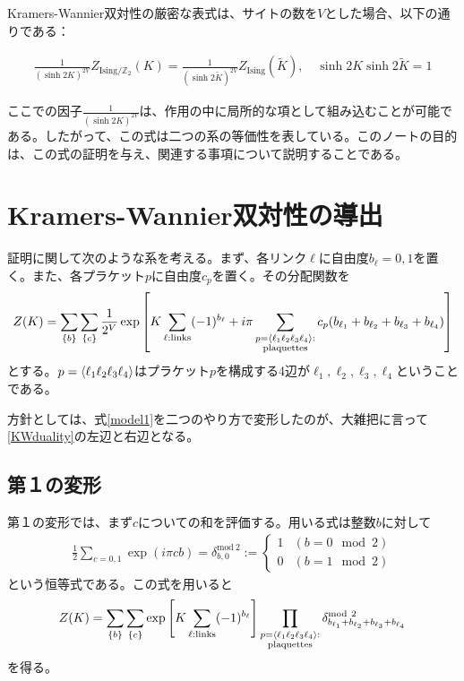 \documentclass[a4paper,12pt,dvipdfmx]{jlreq}
\newenvironment{important}{\begin{tcolorbox}[
  colback = white,
  colframe = red!35,
  boxrule = 2mm,
  fonttitle = \bfseries,
  after = \noindent] }{\end{tcolorbox}}
\newcommand{\Kt}{\widetilde{K}}
\newcommand{\ZIs}{Z_{\mathrm{Ising}}}
\newcommand{\ZGIs}{Z_{\mathrm{Ising}/\mathbb{Z}_2}}
\newcommand{\deltamod}{\delta^{\mathrm{mod}\ 2}}
\begin{document}
Kramers-Wannier双対性の厳密な表式は、サイトの数を$V$とした場合、以下の通りである：
\begin{important}
\begin{align}
\frac{1}{(\sinh 2K)^{2V}}\ZGIs(K)=
\frac{1}{(\sinh 2\Kt)^{2V}}\ZIs(\Kt),\quad \sinh 2K \sinh 2\Kt=1
\label{KWduality}
\end{align}
\end{important}
ここでの因子$\frac{1}{(\sinh 2K)^{2V}}$は、作用の中に局所的な項として組み込むことが可能である。したがって、この式は二つの系の等価性を表している。このノートの目的は、この式の証明を与え、関連する事項について説明することである。

\section{Kramers-Wannier双対性の導出}
証明に関して次のような系を考える。まず、各リンク$\ell$に自由度$b_{\ell}=0,1$を置く。また、各プラケット$p$に自由度$c_{p}$を置く。その分配関数を
\begin{align}
  Z(K)=\sum_{\{b\}}\sum_{\{c\}}\frac{1}{2^{V}} \exp\left[
    K\sum_{\ell:\text{links}}(-1)^{b_{\ell}}+i\pi\sum_{\substack{p=\expval{\ell_1 \ell_2 \ell_3 \ell_4}:\\ \text{plaquettes}}} c_{p}(b_{\ell_1}+b_{\ell_2}+b_{\ell_3}+b_{\ell_4})
  \right]
  \label{model1}
\end{align}
とする。$p=\expval{\ell_1 \ell_2 \ell_3 \ell_4}$はプラケット$p$を構成する4辺が$\ell_1, \ell_2, \ell_3, \ell_4$ということである。

方針としては、式\eqref{model1}を二つのやり方で変形したのが、大雑把に言って\eqref{KWduality}の左辺と右辺となる。

\subsection{第１の変形}
第１の変形では、まず$c$についての和を評価する。用いる式は整数$b$に対して 
\begin{align}
  \frac12\sum_{c=0,1}\exp(i\pi c b )
  =\deltamod_{b,0}
  :=
  \begin{cases}
    1& (b=0 \mod 2)\\
    0& (b=1 \mod 2)
  \end{cases}
  \label{deltamod}
\end{align}
という恒等式である。この式を用いると
\begin{align}
  Z(K)=\sum_{\{b\}}\sum_{\{c\}}\exp\left[
    K\sum_{\ell:\text{links}}(-1)^{b_{\ell}}
    \right]
    \prod_{\substack{p=\expval{\ell_1 \ell_2 \ell_3 \ell_4}:\\ \text{plaquettes}}} \deltamod_{b_{\ell_1}+b_{\ell_2}+b_{\ell_3}+b_{\ell_4}}
    \label{model1-1-1}
\end{align}
を得る。
\end{document}
